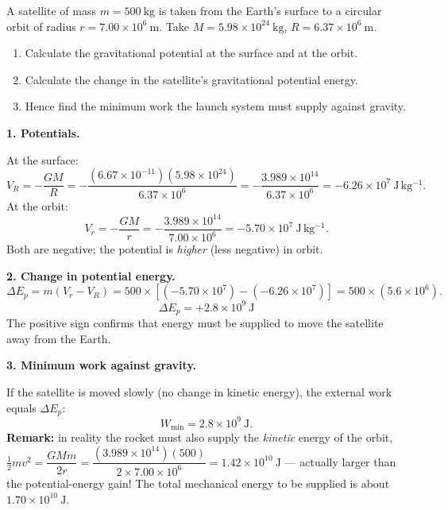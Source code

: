 \documentclass[11pt]{article}
\begin{document}
\begin{exoresolu}
A satellite of mass $m = 500\ \mathrm{kg}$ is taken from the Earth's surface to a circular orbit of radius $r = 7.00\times 10^{6}\ \mathrm{m}$. Take $M = 5.98\times 10^{24}\ \mathrm{kg}$, $R = 6.37\times 10^{6}\ \mathrm{m}$.
\begin{enumerate}
\item Calculate the gravitational potential at the surface and at the orbit.
\item Calculate the change in the satellite's gravitational potential energy.
\item Hence find the minimum work the launch system must supply against gravity.
\end{enumerate}
\tcblower
\textbf{1. Potentials.}

At the surface:
\[ V_R = -\frac{GM}{R} = -\frac{(6.67\times 10^{-11})(5.98\times 10^{24})}{6.37\times 10^{6}} = -\frac{3.989\times 10^{14}}{6.37\times 10^{6}} = -6.26\times 10^{7}\ \mathrm{J\,kg^{-1}}. \]
At the orbit:
\[ V_r = -\frac{GM}{r} = -\frac{3.989\times 10^{14}}{7.00\times 10^{6}} = -5.70\times 10^{7}\ \mathrm{J\,kg^{-1}}. \]
Both are negative; the potential is \emph{higher} (less negative) in orbit.

\textbf{2. Change in potential energy.}
\[ \Delta E_p = m(V_r - V_R) = 500\times\left[(-5.70\times 10^{7}) - (-6.26\times 10^{7})\right] = 500\times(5.6\times 10^{6}). \]
\[ \boxed{\Delta E_p = +2.8\times 10^{9}\ \mathrm{J}} \]
The positive sign confirms that energy must be supplied to move the satellite away from the Earth.

\textbf{3. Minimum work against gravity.}

If the satellite is moved slowly (no change in kinetic energy), the external work equals $\Delta E_p$:
\[ W_{\min} = 2.8\times 10^{9}\ \mathrm{J}. \]
\textbf{Remark:} in reality the rocket must also supply the \emph{kinetic} energy of the orbit, $\tfrac{1}{2}mv^{2} = \dfrac{GMm}{2r} = \dfrac{(3.989\times 10^{14})(500)}{2\times 7.00\times 10^{6}} = 1.42\times 10^{10}\ \mathrm{J}$ — actually larger than the potential-energy gain! The total mechanical energy to be supplied is about $1.70\times 10^{10}\ \mathrm{J}$.
\end{exoresolu}
\end{document}
